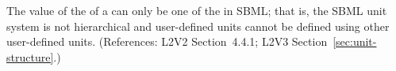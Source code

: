 The value of the   of a \Unit can only be
one of the  in SBML; that is, the SBML unit
system is not hierarchical and user-defined units cannot be defined using
other user-defined units.  (References: L2V2 Section~4.4.1;
L2V3 Section~\ref{sec:unit-structure}.)
